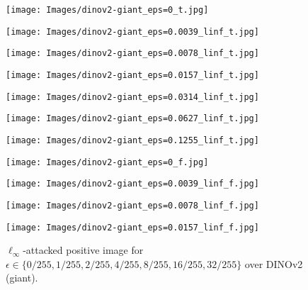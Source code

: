\documentclass[12pt]{article}
\begin{document}
\begin{figure}[ht]
  \centering
  \begin{minipage}{0.125\textwidth}
    \texttt{[image: Images/dinov2-giant\_eps=0\_t.jpg]}
  \end{minipage}
  \hfill
  \begin{minipage}{0.125\textwidth}
    \texttt{[image: Images/dinov2-giant\_eps=0.0039\_linf\_t.jpg]}
  \end{minipage}
  \hfill
  \begin{minipage}{0.125\textwidth}
    \texttt{[image: Images/dinov2-giant\_eps=0.0078\_linf\_t.jpg]}
  \end{minipage}
  \hfill
  \begin{minipage}{0.125\textwidth}
    \texttt{[image: Images/dinov2-giant\_eps=0.0157\_linf\_t.jpg]}
  \end{minipage}
  \hfill
  \begin{minipage}{0.125\textwidth}
    \texttt{[image: Images/dinov2-giant\_eps=0.0314\_linf\_t.jpg]}
  \end{minipage}
  \hfill
  \begin{minipage}{0.125\textwidth}
    \texttt{[image: Images/dinov2-giant\_eps=0.0627\_linf\_t.jpg]}
  \end{minipage}
  \hfill
  \begin{minipage}{0.125\textwidth}
    \texttt{[image: Images/dinov2-giant\_eps=0.1255\_linf\_t.jpg]}
  \end{minipage}
  \label{fig:dino_linf_positive_examples}
  \caption{$\ell_\infty$-attacked positive image for $\epsilon \in \{0/255, 1/255, 2/255, 4/255, 8/255, 16/255, 32/255\}$ over DINOv2 (giant).}
  \vspace{10pt}
  \begin{minipage}{0.125\textwidth}
    \texttt{[image: Images/dinov2-giant\_eps=0\_f.jpg]}
  \end{minipage}
  \hfill
  \begin{minipage}{0.125\textwidth}
    \texttt{[image: Images/dinov2-giant\_eps=0.0039\_linf\_f.jpg]}
  \end{minipage}
  \hfill
  \begin{minipage}{0.125\textwidth}
    \texttt{[image: Images/dinov2-giant\_eps=0.0078\_linf\_f.jpg]}
  \end{minipage}
  \hfill
  \begin{minipage}{0.125\textwidth}
    \texttt{[image: Images/dinov2-giant\_eps=0.0157\_linf\_f.jpg]}

\end{minipage}
\end{figure}
\end{document}
